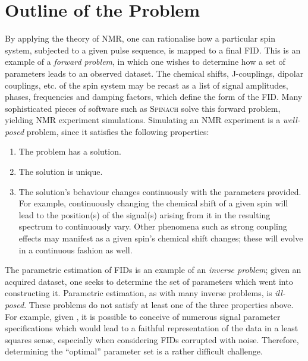 \section{Outline of the Problem}
\label{sec:theory-outline}
By applying the theory of \ac{NMR}, one can
rationalise how a particular spin system, subjected to a given pulse sequence,
is mapped to a final \ac{FID}. This is an example of a \emph{forward problem},
in which one wishes to determine how a set of parameters leads to an
observed dataset.
The chemical shifts, J-couplings, dipolar couplings, etc. of the spin system
may be recast as a list of signal amplitudes, phases, frequencies and
damping factors, which define the form of the \ac{FID}.
Many sophisticated pieces of software such as \textsc{Spinach}\cite{Hogben2011}
solve this forward problem, yielding \ac{NMR} experiment simulations.
Simulating an \ac{NMR} experiment is a \emph{well-posed} problem, since it
satisfies the following properties:
\begin{enumerate}
    \item The problem has a solution.
    \item The solution is unique.
    \item The solution's behaviour changes continuously with the parameters
        provided. For example, continuously changing the chemical shift of a
        given spin will lead to the position(s) of the signal(s) arising from
        it in the resulting spectrum to continuously vary. Other phenomena such
        as strong coupling effects may manifest as a given spin's chemical
        shift changes; these will evolve in a continuous fashion as well.
\end{enumerate}
The parametric estimation of \acp{FID} is an example of an \emph{inverse problem};
given an acquired dataset, one seeks to determine the set of parameters which
went into constructing it.
Parametric estimation, as with many inverse problems, is
\emph{ill-posed}\cite{Kabanikhin2008}. These problems do not satisfy at least
one of the three properties above. For example, given , it is possible
to conceive of numerous signal parameter specifications which would lead to a
faithful representation of the data in a least squares sense, especially when
considering \acp{FID} corrupted with noise.
Therefore, determining the ``optimal'' parameter set is a rather difficult
challenge.


